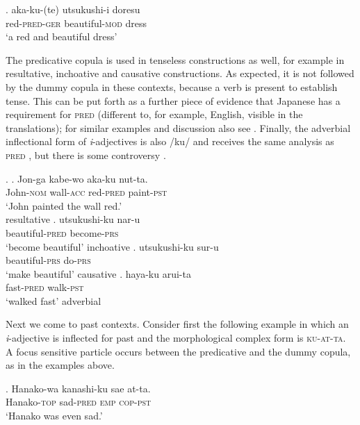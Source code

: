 \documentclass [output=book,colorlinks,citecolor=brown]{langscibook}
\begin{document}
\exg. aka-ku-(te) utsukushi-i doresu\\
red-\textsc{pred-ger} beautiful-\textsc{mod} dress\\
`a red and beautiful dress'

The predicative copula is used in tenseless constructions as well, for example in resultative, inchoative and causative constructions. As expected, it is not followed by the dummy copula in these contexts, because a verb is present to establish tense. This can be put forth as a further piece of evidence that Japanese has a requirement for \textsc{pred} (different to, for example, English, visible in the translations); for similar examples and discussion also see \citet[8–10]{yamada:2023:looking}. Finally, the adverbial inflectional form of \textit{i}-adjectives is also /ku/ and receives the same analysis as \textsc{pred} \citep{nishiyama:2005:baker}, but there is some controversy \citep{namai:2002:word}. %


\ex. \ag. Jon-ga kabe-wo aka-ku nut-ta.\\
John-\textsc{nom} wall-\textsc{acc} red-\textsc{pred} paint-\textsc{pst}\\
`John painted the wall red.’ \\ \null\hfill resultative \citep[153]{nishiyama:2005:baker}
\bg. utsukushi-ku nar-u\\
beautiful-\textsc{pred} become-\textsc{prs}\\
`become beautiful' \null \hfill inchoative
\cg. utsukushi-ku sur-u\\
beautiful-\textsc{prs} do-\textsc{prs}\\
`make beautiful' \null \hfill causative
\dg. haya-ku arui-ta\\
fast-\textsc{pred} walk-\textsc{pst}\\
`walked fast' \null \hfill adverbial

Next we come to past contexts. Consider first the following example in which an \textit{i}-adjective is inflected for past and the morphological complex form is \textsc{ku-at-ta}. A focus sensitive particle occurs between the predicative and the dummy copula, as in the examples above.%

\exg. Hanako-wa kanashi-ku sae at-ta.\\
Hanako-\textsc{top} sad-\textsc{pred} \textsc{emp} \textsc{cop-pst}\\
`Hanako was even sad.' \null\hfill \citep[109]{kubo:1992:japanese}
\end{document}
